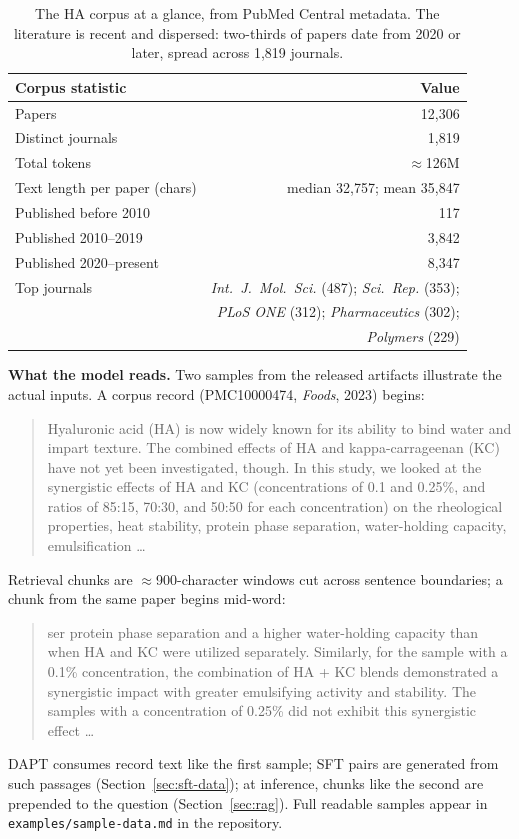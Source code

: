 \documentclass[11pt]{article}
\begin{document}
\begin{table}[t]
\centering
\begin{tabular}{lr}
\toprule
Corpus statistic & Value \\
\midrule
Papers & 12,306 \\
Distinct journals & 1,819 \\
Total tokens & $\approx$126M \\
Text length per paper (chars) & median 32,757; mean 35,847 \\
\midrule
Published before 2010 & 117 \\
Published 2010--2019 & 3,842 \\
Published 2020--present & 8,347 \\
\midrule
Top journals & \emph{Int.\ J.\ Mol.\ Sci.} (487); \emph{Sci.\ Rep.} (353); \\
 & \emph{PLoS ONE} (312); \emph{Pharmaceutics} (302); \\
 & \emph{Polymers} (229) \\
\bottomrule
\end{tabular}
\caption{The HA corpus at a glance, from PubMed Central metadata. The
literature is recent and dispersed: two-thirds of papers date from 2020
or later, spread across 1,819 journals.}
\label{tab:corpus}
\end{table}

\textbf{What the model reads.} Two samples from the released artifacts
illustrate the actual inputs. A corpus record (PMC10000474,
\emph{Foods}, 2023) begins:
\begin{quote}\small
Hyaluronic acid (HA) is now widely known for its ability to bind water
and impart texture. The combined effects of HA and kappa-carrageenan
(KC) have not yet been investigated, though. In this study, we looked at
the synergistic effects of HA and KC (concentrations of 0.1 and 0.25\%,
and ratios of 85:15, 70:30, and 50:50 for each concentration) on the
rheological properties, heat stability, protein phase separation,
water-holding capacity, emulsification \ldots
\end{quote}
Retrieval chunks are $\approx$900-character windows cut across sentence
boundaries; a chunk from the same paper begins mid-word:
\begin{quote}\small
ser protein phase separation and a higher water-holding capacity than
when HA and KC were utilized separately. Similarly, for the sample with
a 0.1\% concentration, the combination of HA + KC blends demonstrated a
synergistic impact with greater emulsifying activity and stability. The
samples with a concentration of 0.25\% did not exhibit this synergistic
effect \ldots
\end{quote}
DAPT consumes record text like the first sample; SFT pairs are
generated from such passages (Section~\ref{sec:sft-data}); at
inference, chunks like the second are prepended to the question
(Section~\ref{sec:rag}). Full readable samples appear in
\texttt{examples/sample-data.md} in the repository.
\end{document}
